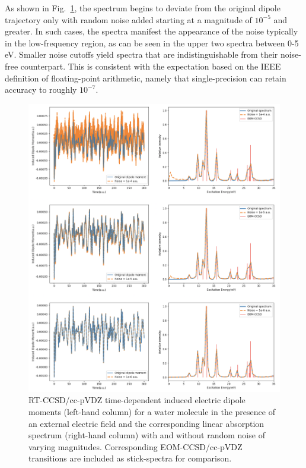 As shown in Fig.~\ref{fig:sp-noise}, the spectrum begins to deviate from
the original dipole trajectory only with random noise added starting at a magnitude
of $10^{-5}$ and greater.  In such cases, the spectra manifest the appearance of
the noise typically in the low-frequency region, as can be seen in the upper two
spectra between 0-5 eV.  Smaller noise cutoffs yield spectra that are
indistinguishable from their noise-free counterpart.  This is consistent with
the expectation based on the IEEE definition of floating-point arithmetic,
namely that single-precision can retain accuracy to roughly $10^{-7}$. 
\begin{figure}
    \centering
    \includegraphics[angle=0, scale=0.4]{ch3/Figs/1-5.png}
    \caption{RT-CCSD/cc-pVDZ time-dependent induced electric dipole moments (left-hand
column) for a water molecule in the presence of an external electric field and
the corresponding linear absorption spectrum (right-hand column) with and
without random noise of varying magnitudes. Corresponding EOM-CCSD/cc-pVDZ 
transitions are included as stick-spectra for comparison.}
    \label{fig:sp-noise}
\end{figure}


